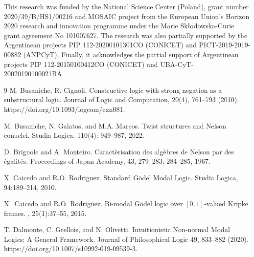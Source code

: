 \documentclass[pdflatex,sn-mathphys-num]{sn-jnl}%
\theoremstyle{thmstyleone}%
\theoremstyle{thmstyletwo}%
\theoremstyle{thmstylethree}%
\begin{document}
\backmatter


 This research was funded by the National Science Center (Poland), grant number 2020/39/B/HS1/00216 and MOSAIC project from the European Union’s Horizon 2020 research and innovation programme under the Marie Skłodowska-Curie grant agreement No 101007627. The research was also partially supported by the Argentinean projects PIP 112-20200101301CO (CONICET) and PICT-2019-2019-00882 (ANPCyT). Finally, it acknowledges the partial support of Argentinean projects PIP 112-20150100412CO (CONICET) and UBA-CyT-20020190100021BA.


\begin{thebibliography}{9}
 M. Busaniche, R. Cignoli.  Constructive logic with strong negation as a substructural logic. Journal of Logic and Computation, 20(4), 761–793 (2010). https://doi.org/10.1093/logcom/exn081. 

 M. Busaniche, N. Galatos, and M.A. Marcos. Twist structures and Nelson conuclei. Studia Logica, 110(4): 949--987, 2022.

 D. Brignole and A. Monteiro. Caractèrisation des algèbres de Nelson par des égalités. Proceedings of Japan Academy, 43, 279–283; 284–285, 1967.


X. Caicedo and R.O. Rodriguez. Standard G\"odel Modal Logic. Studia Logica, 94:189--214, 2010.

X.~Caicedo and R.O. Rodriguez.
\newblock Bi-modal {G}{\"o}del logic over $[0,1]$-valued {K}ripke frames.
, 25(1):37--55, 2015.

T. Dalmonte, C. Grellois,  and  N. Olivetti. Intuitionistic Non-normal Modal Logics: A General Framework. Journal of Philosophical Logic 49, 833–882 (2020). https://doi.org/10.1007/s10992-019-09539-3.




\end{thebibliography}
\end{document}
